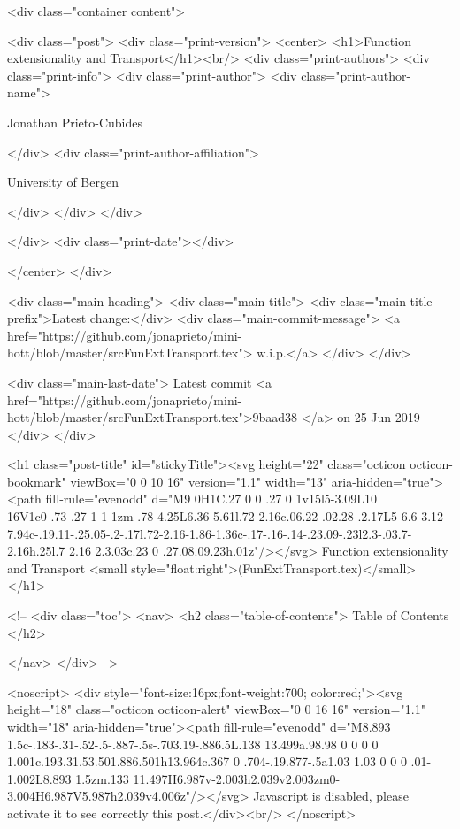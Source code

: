       <div class="container content">
        







<div class="post">
  <div class="print-version">
    <center>
      <h1>Function extensionality and Transport</h1><br/>
        <div class="print-authors">
          <div class="print-info">
            <div class="print-author">
              <div class="print-author-name">
                
                  Jonathan Prieto-Cubides
                
              </div>
              <div class="print-author-affiliation">
                
                  University of Bergen
                
                </div>
            </div>
          </div>
          
          
        </div>
        <div class="print-date"></div>
        
        
    </center>
  </div>

  
  <div class="main-heading">
    <div class="main-title">
      <div class="main-title-prefix">Latest change:</div>
      <div class="main-commit-message">
            <a href="https://github.com/jonaprieto/mini-hott/blob/master/srcFunExtTransport.tex">
              w.i.p.</a>
      </div>
    </div>

    <div class="main-last-date">
      Latest commit <a href="https://github.com/jonaprieto/mini-hott/blob/master/srcFunExtTransport.tex">9baad38 </a> on  25 Jun 2019
    </div>
  </div>
  

  <h1 class="post-title" id="stickyTitle"><svg height="22" class="octicon octicon-bookmark" viewBox="0 0 10 16" version="1.1" width="13" aria-hidden="true"><path fill-rule="evenodd" d="M9 0H1C.27 0 0 .27 0 1v15l5-3.09L10 16V1c0-.73-.27-1-1-1zm-.78 4.25L6.36 5.61l.72 2.16c.06.22-.02.28-.2.17L5 6.6 3.12 7.94c-.19.11-.25.05-.2-.17l.72-2.16-1.86-1.36c-.17-.16-.14-.23.09-.23l2.3-.03.7-2.16h.25l.7 2.16 2.3.03c.23 0 .27.08.09.23h.01z"/></svg> Function extensionality and Transport <small style="float:right">(FunExtTransport.tex)</small>
  </h1>

  <!-- 
  <div class="toc">
    <nav>
    <h2 class="table-of-contents"> Table of Contents </h2>
      

    </nav>
  </div>
   -->

  <noscript>
  <div style="font-size:16px;font-weight:700; color:red;"><svg height="18" class="octicon octicon-alert" viewBox="0 0 16 16" version="1.1" width="18" aria-hidden="true"><path fill-rule="evenodd" d="M8.893 1.5c-.183-.31-.52-.5-.887-.5s-.703.19-.886.5L.138 13.499a.98.98 0 0 0 0 1.001c.193.31.53.501.886.501h13.964c.367 0 .704-.19.877-.5a1.03 1.03 0 0 0 .01-1.002L8.893 1.5zm.133 11.497H6.987v-2.003h2.039v2.003zm0-3.004H6.987V5.987h2.039v4.006z"/></svg> Javascript is disabled, please activate it to see correctly this post.</div><br/>
  </noscript>


